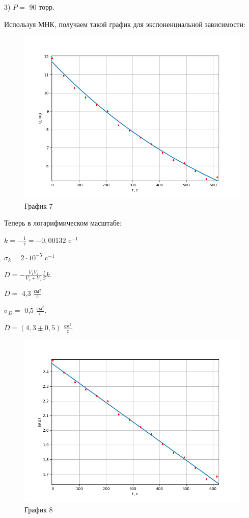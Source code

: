 \documentclass[a4paper,12pt]{article} %
\begin{document}
\begin{enumerate}
\newpage

3) $P = $ 90 торр.

Используя МНК, получаем такой график для экспоненциальной зависимости:
\begin{figure}[h!]
	\centering
	\includegraphics[scale=0.8]{График3(эксп).png}
	\caption*{График 7}
\end{figure}

Теперь в логарифмическом масштабе:

$k = -\frac{1}{\tau} = -0,00132$ c$^{-1}$

$\sigma_{k} = 2\cdot 10^{-5}$ c$^{-1}$

$D = - \frac{V_{1}V_{2}}{V_{1} + V_{2}}\frac{l}{S}k$.

$D = $ 4,3 $\frac{\text{см}^2}{\text{c}}$

$\sigma_{D} = $ 0,5 $\frac{\text{см}^2}{\text{c}}$.
\vspace{15mm}

$D = (4,3 \pm 0,5)$ $\frac{\text{см}^2}{\text{c}}$.
\newpage
\begin{figure}[h!]
	\centering
	\includegraphics[scale=0.8]{График3(лин).png}
	\caption*{График 8}
\end{figure}


\end{enumerate}
\end{document}
